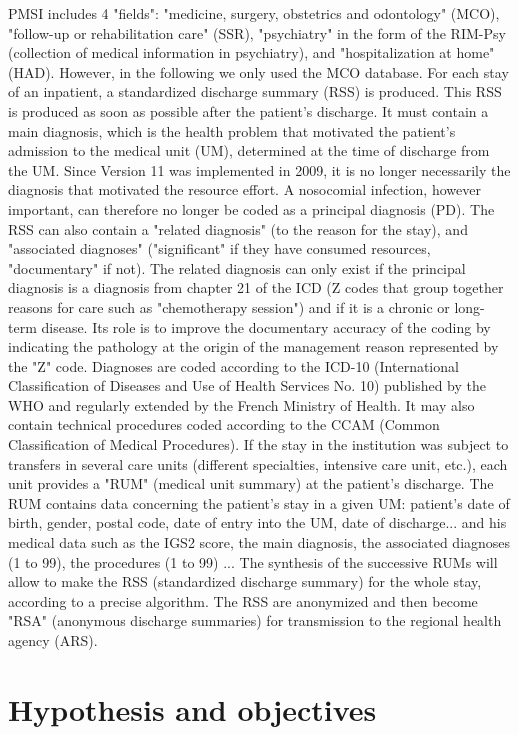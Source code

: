 PMSI includes 4 "fields": "medicine, surgery, obstetrics and odontology" (MCO),
"follow-up or rehabilitation care" (SSR), "psychiatry" in the form of the
RIM-Psy (collection of medical information in psychiatry), and "hospitalization
at home" (HAD). However, in the following we only used the MCO database. For
each stay of an inpatient, a standardized discharge summary (RSS) is produced.
This RSS is produced as soon as possible after the patient's discharge. It must
contain a main diagnosis, which is the health problem that motivated the
patient's admission to the medical unit (UM), determined at the time of
discharge from the UM. Since Version 11 was implemented in 2009, it is no longer
necessarily the diagnosis that motivated the resource effort. A nosocomial
infection, however important, can therefore no longer be coded as a principal
diagnosis (PD). The RSS can also contain a "related diagnosis" (to the reason
for the stay), and "associated diagnoses" ("significant" if they have consumed
resources, "documentary" if not). The related diagnosis can only exist if the
principal diagnosis is a diagnosis from chapter 21 of the ICD (Z codes that
group together reasons for care such as "chemotherapy session") and if it is a
chronic or long-term disease. Its role is to improve the documentary accuracy of
the coding by indicating the pathology at the origin of the management reason
represented by the "Z" code.
Diagnoses are coded according to the ICD-10 (International Classification of
Diseases and Use of Health Services No. 10) published by the WHO and regularly
extended by the French Ministry of Health. It may also contain technical
procedures coded according to the CCAM (Common Classification of Medical
Procedures). If the stay in the institution was subject to transfers in several
care units (different specialties, intensive care unit, etc.), each unit
provides a "RUM" (medical unit summary) at the patient's discharge. The RUM
contains data concerning the patient's stay in a given UM: patient's date of
birth, gender, postal code, date of entry into the UM, date of discharge... and
his medical data such as the IGS2 score, the main diagnosis, the associated
diagnoses (1 to 99), the procedures (1 to 99) ... The synthesis of the
successive RUMs will allow to make the RSS (standardized discharge summary) for
the whole stay, according to a precise algorithm. The RSS are anonymized and
then become "RSA" (anonymous discharge summaries) for transmission to the
regional health agency (ARS).

\section{Hypothesis and objectives}

